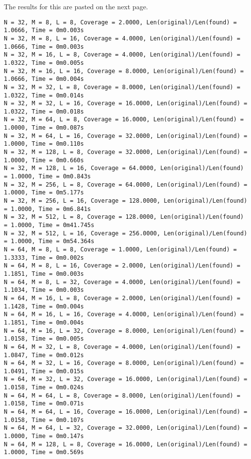 \documentclass{article}
\begin{document}
The results for this are pasted on the next page.
\clearpage
{\small
\begin{verbatim}
N = 32, M = 8, L = 8, Coverage = 2.0000, Len(original)/Len(found) = 1.0666, Time = 0m0.003s
N = 32, M = 8, L = 16, Coverage = 4.0000, Len(original)/Len(found) = 1.0666, Time = 0m0.003s
N = 32, M = 16, L = 8, Coverage = 4.0000, Len(original)/Len(found) = 1.0322, Time = 0m0.005s
N = 32, M = 16, L = 16, Coverage = 8.0000, Len(original)/Len(found) = 1.0666, Time = 0m0.004s
N = 32, M = 32, L = 8, Coverage = 8.0000, Len(original)/Len(found) = 1.0322, Time = 0m0.014s
N = 32, M = 32, L = 16, Coverage = 16.0000, Len(original)/Len(found) = 1.0322, Time = 0m0.018s
N = 32, M = 64, L = 8, Coverage = 16.0000, Len(original)/Len(found) = 1.0000, Time = 0m0.087s
N = 32, M = 64, L = 16, Coverage = 32.0000, Len(original)/Len(found) = 1.0000, Time = 0m0.110s
N = 32, M = 128, L = 8, Coverage = 32.0000, Len(original)/Len(found) = 1.0000, Time = 0m0.660s
N = 32, M = 128, L = 16, Coverage = 64.0000, Len(original)/Len(found) = 1.0000, Time = 0m0.843s
N = 32, M = 256, L = 8, Coverage = 64.0000, Len(original)/Len(found) = 1.0000, Time = 0m5.177s
N = 32, M = 256, L = 16, Coverage = 128.0000, Len(original)/Len(found) = 1.0000, Time = 0m6.841s
N = 32, M = 512, L = 8, Coverage = 128.0000, Len(original)/Len(found) = 1.0000, Time = 0m41.745s
N = 32, M = 512, L = 16, Coverage = 256.0000, Len(original)/Len(found) = 1.0000, Time = 0m54.364s
N = 64, M = 8, L = 8, Coverage = 1.0000, Len(original)/Len(found) = 1.3333, Time = 0m0.002s
N = 64, M = 8, L = 16, Coverage = 2.0000, Len(original)/Len(found) = 1.1851, Time = 0m0.003s
N = 64, M = 8, L = 32, Coverage = 4.0000, Len(original)/Len(found) = 1.1034, Time = 0m0.003s
N = 64, M = 16, L = 8, Coverage = 2.0000, Len(original)/Len(found) = 1.1428, Time = 0m0.004s
N = 64, M = 16, L = 16, Coverage = 4.0000, Len(original)/Len(found) = 1.1851, Time = 0m0.004s
N = 64, M = 16, L = 32, Coverage = 8.0000, Len(original)/Len(found) = 1.0158, Time = 0m0.005s
N = 64, M = 32, L = 8, Coverage = 4.0000, Len(original)/Len(found) = 1.0847, Time = 0m0.012s
N = 64, M = 32, L = 16, Coverage = 8.0000, Len(original)/Len(found) = 1.0491, Time = 0m0.015s
N = 64, M = 32, L = 32, Coverage = 16.0000, Len(original)/Len(found) = 1.0158, Time = 0m0.024s
N = 64, M = 64, L = 8, Coverage = 8.0000, Len(original)/Len(found) = 1.0158, Time = 0m0.071s
N = 64, M = 64, L = 16, Coverage = 16.0000, Len(original)/Len(found) = 1.0158, Time = 0m0.107s
N = 64, M = 64, L = 32, Coverage = 32.0000, Len(original)/Len(found) = 1.0000, Time = 0m0.147s
N = 64, M = 128, L = 8, Coverage = 16.0000, Len(original)/Len(found) = 1.0000, Time = 0m0.569s

\end{verbatim}}
\end{document}
